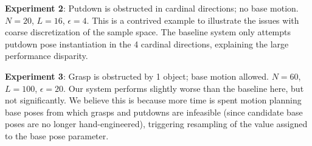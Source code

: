 \textbf{Experiment 2}: Putdown is obstructed in cardinal directions; no base motion.
$N = 20$, $L = 16$, $\epsilon = 4$. This is a contrived example to illustrate the
issues with coarse discretization of the sample space.
The baseline system only attempts putdown pose instantiation in the
4 cardinal directions, explaining the large performance disparity.

\textbf{Experiment 3}: Grasp is obstructed by 1 object; base motion allowed.
$N = 60$, $L = 100$, $\epsilon = 20$. Our system performs slightly worse than the baseline
here, but not significantly. We believe this is because more time is spent motion planning
base poses from which grasps and putdowns are infeasible (since candidate base poses are no
longer hand-engineered), triggering resampling of the value assigned to the base pose parameter.
